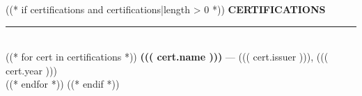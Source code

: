 \documentclass[11pt,a4paper]{article}
\begin{document}
\begin{minipage}[t]{0.60\textwidth}
\begin{minipage}[t]{0.88\textwidth}
((* if certifications and certifications|length > 0 *))
{\fontsize{11}{13}\selectfont\bfseries\color{dark}\MakeUppercase{Certifications}}\\[2pt]
{\color{dark!30}\rule{\linewidth}{0.4pt}}\\[6pt]
((* for cert in certifications *))
{\bfseries ((( cert.name )))} --- {\small\color{muted} ((( cert.issuer ))), ((( cert.year )))}\\[6pt]
((* endfor *))
((* endif *))

\end{minipage}
\end{minipage}
\end{document}
